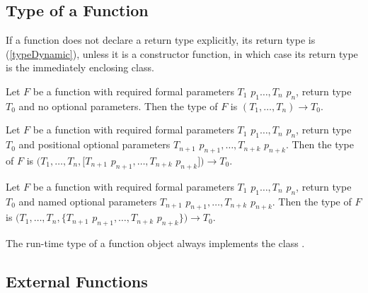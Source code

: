 \documentclass{article}
\begin{document}
\subsection{Type of a Function}

\LMHash{}
If a function does not declare a return type explicitly, its return type is \DYNAMIC{} (\ref{typeDynamic}), unless it is a constructor function, in which case its return type is the immediately enclosing class.

\LMHash{}
Let $F$ be a function with required formal parameters $T_1$ $p_1 \ldots, T_n$ $p_n$, return type $T_0$ and no optional parameters. Then the type of $F$ is $(T_1 ,\ldots, T_n) \rightarrow T_0$.

\LMHash{}
Let $F$ be a function with required formal parameters $T_1$ $p_1 \ldots, T_n$ $p_n$, return type $T_0$ and positional optional parameters $T_{n+1}$ $p_{n+1}, \ldots, T_{n+k}$ $ p_{n+k}$. Then the type of $F$ is $(T_1 ,\ldots, T_n, [T_{n+1}$ $p_{n+1}, \ldots, T_{n+k}$  $p_{n+k}]) \rightarrow T_0$.

\LMHash{}
Let $F$ be a function with required formal parameters $T_1$ $p_1 \ldots, T_n$ $p_n$, return type $T_0$ and named optional parameters $T_{n+1}$ $p_{n+1}, \ldots, T_{n+k}$ $ p_{n+k}$. Then the type of $F$ is $(T_1 ,\ldots, T_n, \{T_{n+1}$ $p_{n+1}, \ldots, T_{n+k}$  $p_{n+k}\}) \rightarrow T_0$.

\LMHash{}
The run-time type of a function object always implements the class .



\subsection{External Functions}
\end{document}
